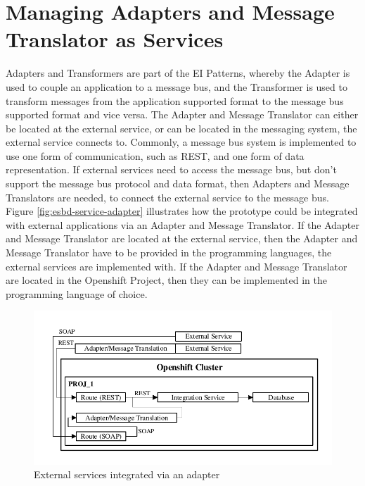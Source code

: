 \section{Managing Adapters and Message Translator as Services}
\label{sec:esbd-adap-trans-service}
Adapters and Transformers are part of the EI Patterns, whereby the Adapter is used to couple an application to a message bus, and the Transformer is used to transform messages from the application supported format to the message bus supported format and vice versa. The Adapter and Message Translator can either be  located at the external service, or can be located in the messaging system, the external service connects to. Commonly, a message bus system is implemented to use one form of communication, such as REST, and one form of data representation. If external services need to access the message bus, but don't support the message bus protocol and data format, then Adapters and Message Translators are needed, to connect the external service to the message bus. \\

Figure \vref{fig:esbd-service-adapter} illustrates how the prototype could be integrated with external applications via an Adapter and Message Translator. If the Adapter and Message Translator are located at the external service, then the Adapter and Message Translator have to be provided in the programming languages, the external services are implemented with. If the Adapter and Message Translator are located in the Openshift Project, then they can be implemented in the programming language of choice.

\begin{figure}[htbp]
	\centering
	\includegraphics[scale=1]{images/esbd-service-adapter.pdf}
	\caption{External services integrated via an adapter}
	\label{fig:esbd-service-adapter}
\end{figure}

